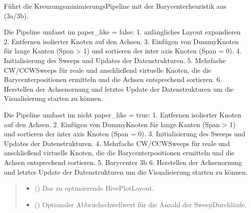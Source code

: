 \documentclass[a4paper,10pt,ngerman]{sphinxmanual}
\begin{document}
\begin{fulllineitems}
\label{\detokenize{api:src.crossing_minimization.barycenter_crossmin_pipeline}}
\pysigstartsignatures
\pysiglinewithargsret
{}
{\sphinxparamcomma {}\sphinxparamcomma {}\sphinxparamcomma {}}
{}
\pysigstopsignatures
\sphinxAtStartPar
Führt die Kreuzungsminimierungs\sphinxhyphen{}Pipeline mit der Barycenterheuristik aus (3a/3b).

\sphinxAtStartPar
Die Pipeline umfasst im paper\_like = false:
1. anfängliches Layout expandieren
2. Entfernen isolierter Knoten auf den Achsen.
3. Einfügen von Dummy\sphinxhyphen{}Knoten für lange Kanten (Span \textgreater{} 1) und sortieren der inter axis Knoten (Span = 0).
4. Initialisierung des Sweeps und Updates der Datenstrukturen.
5. Mehrfache CW/CCW\sphinxhyphen{}Sweeps für reale und anschließend virtuelle Knoten, die die Barycenterpositionen ermitteln und die Achsen entsprechend sortieren.
6. Herstellen der Achsenornung und letztes Update der Datenstrukturen um die Visualisierung starten zu können.

\sphinxAtStartPar
Die Pipeline umfasst im nicht paper\_like = true:
1. Entfernen isolierter Knoten auf den Achsen.
2. Einfügen von Dummy\sphinxhyphen{}Knoten für lange Kanten (Span \textgreater{} 1) und sortieren der inter axis Knoten (Span = 0).
3. Initialisierung des Sweeps und Updates der Datenstrukturen.
4. Mehrfache CW/CCW\sphinxhyphen{}Sweeps für reale und anschließend virtuelle Knoten, die die Barycenterpositionen ermitteln und die Achsen entsprechend sortieren.
5. Barycenter 3b
6. Herstellen der Achsenornung und letztes Update der Datenstrukturen um die Visualisierung starten zu können.
\begin{quote}\begin{description}
\begin{itemize}
\item {} 
\sphinxAtStartPar
{} () \textendash{} Das zu optimierende HivePlotLayout.

\item {} 
\sphinxAtStartPar
{} () \textendash{} Optionaler Abbruchschwellwert für die Anzahl der Sweep\sphinxhyphen{}Durchläufe.


\end{itemize}
\end{description}
\end{quote}
\end{fulllineitems}
\end{document}
